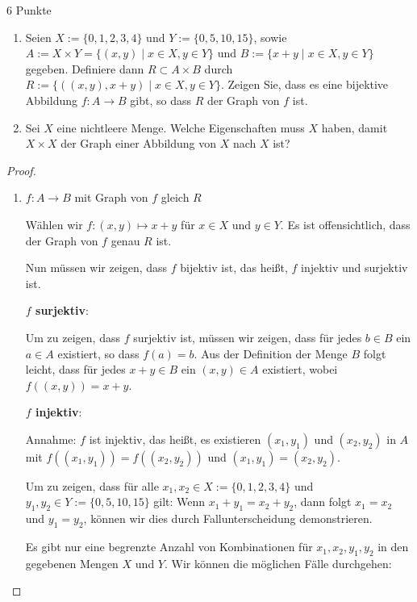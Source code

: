\documentclass{problemset}
\begin{document}
\pagebreak

\begin{problem}[Graphen]{6 Punkte}
\begin{enumerate}
	\item Seien $X := \{0, 1, 2, 3, 4\}$ und $Y := \{0, 5, 10, 15\}$, sowie $A := X \times Y = \{(x, y) \mid x \in X, y \in Y\}$ und $B := \{x + y \mid x \in X, y \in Y\}$ gegeben. Definiere dann $R \subset A \times B$ durch $R := \{((x, y), x + y) \mid x \in X, y \in Y\}$.
	      Zeigen Sie, dass es eine bijektive Abbildung $f : A \to B$ gibt, so dass $R$ der Graph von $f$ ist.

	\item Sei $X$ eine nichtleere Menge. Welche Eigenschaften muss $X$ haben, damit $X \times X$ der Graph einer Abbildung von $X$ nach $X$ ist?

\end{enumerate}

\begin{proof} $ $
	\begin{enumerate}
		\item $f: A \rightarrow B$ mit Graph von $f$ gleich $R$

		      Wählen wir \(f: (x, y) \mapsto x + y\) für \(x \in X\) und \(y \in Y\).
		      Es ist offensichtlich, dass der Graph von \(f\) genau \(R\) ist.

		      Nun müssen wir zeigen, dass \(f\) bijektiv ist, das heißt, \(f\) injektiv und surjektiv ist.

		      \textbf{\(f\) surjektiv}:

		      Um zu zeigen, dass \(f\) surjektiv ist, müssen wir zeigen, dass für jedes \(b \in B\) ein \(a \in A\) existiert, so dass \(f(a) = b\).
		      Aus der Definition der Menge \(B\) folgt leicht, dass für jedes \(x + y \in B\) ein \((x, y) \in A\) existiert, wobei \(f((x, y)) = x + y\).

		      \textbf{\(f\) injektiv}:

		      Annahme: \(f\) ist injektiv, das heißt, es existieren \((x_1, y_1)\) und \((x_2, y_2)\) in \(A\) mit \(f((x_1, y_1)) = f((x_2, y_2))\) und \((x_1, y_1) = (x_2, y_2)\).

		      Um zu zeigen, dass für alle \(x_1, x_2 \in X := \{0, 1, 2, 3, 4\}\) und \(y_1, y_2 \in Y := \{0, 5, 10, 15\}\) gilt: Wenn \(x_1 + y_1 = x_2 + y_2\), dann folgt \(x_1 = x_2\) und \(y_1 = y_2\), können wir dies durch Fallunterscheidung demonstrieren.

		      Es gibt nur eine begrenzte Anzahl von Kombinationen für \(x_1, x_2, y_1, y_2\) in den gegebenen Mengen \(X\) und \(Y\). Wir können die möglichen Fälle durchgehen:


\end{enumerate}
\end{proof}
\end{problem}
\end{document}
